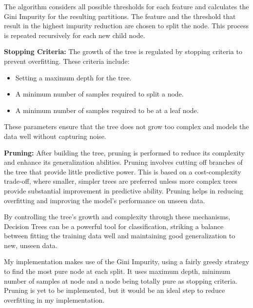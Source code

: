 \documentclass[letterpaper,10pt]{article}
\begin{document}
The algorithm considers all possible thresholds for each feature and calculates the Gini Impurity for the resulting partitions. The feature and the threshold that result in the highest impurity reduction are chosen to split the node. This process is repeated recursively for each new child node.

\textbf{Stopping Criteria:}
The growth of the tree is regulated by stopping criteria to prevent overfitting. These criteria include:

\begin{itemize}
    \item Setting a maximum depth for the tree.
    \item A minimum number of samples required to split a node.
    \item A minimum number of samples required to be at a leaf node.
\end{itemize}
These parameters ensure that the tree does not grow too complex and models the data well without capturing noise.

\textbf{Pruning:}
After building the tree, pruning is performed to reduce its complexity and enhance its generalization abilities. Pruning involves cutting off branches of the tree that provide little predictive power. This is based on a cost-complexity trade-off, where smaller, simpler trees are preferred unless more complex trees provide substantial improvement in predictive ability. Pruning helps in reducing overfitting and improving the model's performance on unseen data. \par

By controlling the tree's growth and complexity through these mechanisms, Decision Trees can be a powerful tool for classification, striking a balance between fitting the training data well and maintaining good generalization to new, unseen data. \par

My implementation makes use of the Gini Impurity, using a fairly greedy strategy to find the most pure node at each split. It uses maximum depth, minimum number of samples at node and a node being totally pure as stopping criteria. Pruning is yet to be implemented, but it would be an ideal step to reduce overfitting in my implementation. 
\end{document}
